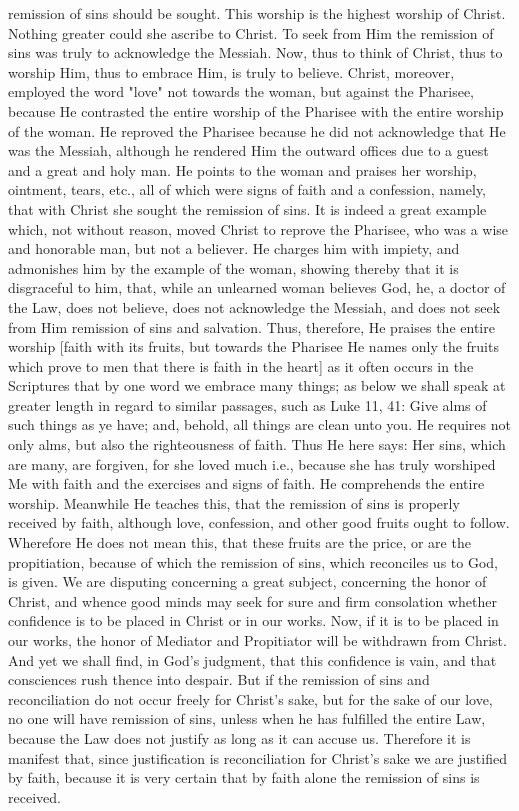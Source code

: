 remission of sins should be sought.  This worship is the highest
worship of Christ.  Nothing greater could she ascribe to Christ.  To
seek from Him the remission of sins was truly to acknowledge the
Messiah.  Now, thus to think of Christ, thus to worship Him, thus to
embrace Him, is truly to believe.  Christ, moreover, employed the
word "love" not towards the woman, but against the Pharisee, because
He contrasted the entire worship of the Pharisee with the entire
worship of the woman.  He reproved the Pharisee because he did not
acknowledge that He was the Messiah, although he rendered Him the
outward offices due to a guest and a great and holy man.  He points
to the woman and praises her worship, ointment, tears, etc., all of
which were signs of faith and a confession, namely, that with Christ
she sought the remission of sins.  It is indeed a great example which,
not without reason, moved Christ to reprove the Pharisee, who was a
wise and honorable man, but not a believer.  He charges him with
impiety, and admonishes him by the example of the woman, showing
thereby that it is disgraceful to him, that, while an unlearned woman
believes God, he, a doctor of the Law, does not believe, does not
acknowledge the Messiah, and does not seek from Him remission of sins
and salvation.  Thus, therefore, He praises the entire worship [faith
with its fruits, but towards the Pharisee He names only the fruits
which prove to men that there is faith in the heart] as it often
occurs in the Scriptures that by one word we embrace many things; as
below we shall speak at greater length in regard to similar passages,
such as Luke 11, 41: Give alms of such things as ye have; and, behold,
all things are clean unto you.  He requires not only alms, but also
the righteousness of faith.  Thus He here says: Her sins, which are
many, are forgiven, for she loved much i.e., because she has truly
worshiped Me with faith and the exercises and signs of faith.  He
comprehends the entire worship.  Meanwhile He teaches this, that the
remission of sins is properly received by faith, although love,
confession, and other good fruits ought to follow.  Wherefore He does
not mean this, that these fruits are the price, or are the
propitiation, because of which the remission of sins, which
reconciles us to God, is given.  We are disputing concerning a great
subject, concerning the honor of Christ, and whence good minds may
seek for sure and firm consolation whether confidence is to be placed
in Christ or in our works.  Now, if it is to be placed in our works,
the honor of Mediator and Propitiator will be withdrawn from Christ.
And yet we shall find, in God's judgment, that this confidence is
vain, and that consciences rush thence into despair.  But if the
remission of sins and reconciliation do not occur freely for Christ's
sake, but for the sake of our love, no one will have remission of
sins, unless when he has fulfilled the entire Law, because the Law
does not justify as long as it can accuse us.  Therefore it is
manifest that, since justification is reconciliation for Christ's
sake we are justified by faith, because it is very certain that by
faith alone the remission of sins is received.

